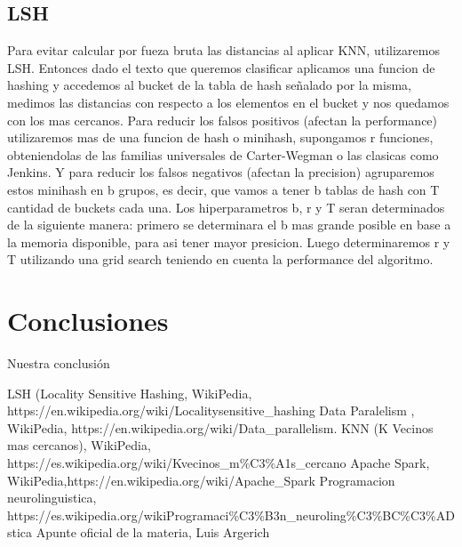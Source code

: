 \documentclass[a4paper,10pt]{article}
\begin{document}
	
	\subsection{LSH}
	
	Para evitar calcular por fueza bruta las distancias al aplicar KNN, utilizaremos LSH. Entonces dado el texto que queremos clasificar aplicamos una funcion de hashing y accedemos al bucket de la tabla de hash señalado por la misma, medimos las distancias con respecto a los elementos en el bucket y nos quedamos con los mas cercanos. Para reducir los falsos positivos (afectan la performance) utilizaremos mas de una funcion de hash o minihash, supongamos r funciones, obteniendolas de las familias universales de Carter-Wegman o las clasicas como Jenkins. Y para reducir los falsos negativos (afectan la precision) agruparemos estos minihash en b grupos, es decir, que vamos a tener b tablas de hash con T cantidad de buckets cada una.
	 Los hiperparametros b, r y T seran determinados de la siguiente manera: primero se determinara el b mas grande posible en base a la memoria disponible, para asi tener mayor presicion. Luego determinaremos r y T utilizando una grid search teniendo en cuenta la performance del algoritmo.

	
	\section{Conclusiones}
	
	Nuestra conclusi\'{o}n
	
	\begin{thebibliography}{99}
		 LSH (Locality Sensitive Hashing, WikiPedia, https://en.wikipedia.org/wiki/Locality\-sensitive\_hashing
		 Data Paralelism , WikiPedia, https://en.wikipedia.org/wiki/Data\_parallelism.
		 KNN (K Vecinos mas cercanos), WikiPedia, https://es.wikipedia.org/wiki/K\-vecinos\_m\%C3\%A1s\_cercano
		 Apache Spark, WikiPedia,https://en.wikipedia.org/wiki/Apache\_Spark
		 Programacion neurolinguistica, https://es.wikipedia.org/wikiProgramaci\%C3\%B3n\_neuroling\%C3\%BC\%C3\%ADstica
		 Apunte oficial de la materia, Luis Argerich

	\end{thebibliography}
	
\end{document}
